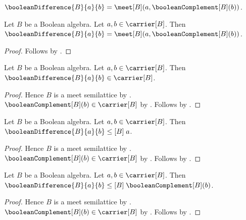 \begin{definition}\label{boolean_difference}
    $\booleanDifference{B}{a}{b}
        =\meet[B](a,\booleanComplement[B](b))$.
\end{definition}

\begin{proposition}\label{boolean_difference_apply}
    Let $B$ be a Boolean algebra.
    Let $a,b\in\carrier[B]$.
    Then $\booleanDifference{B}{a}{b}
        =\meet[B](a,\booleanComplement[B](b))$.
\end{proposition}
\begin{proof}
    Follows by .
\end{proof}

\begin{proposition}\label{boolean_difference_type}
    Let $B$ be a Boolean algebra.
    Let $a,b\in\carrier[B]$.
    Then $\booleanDifference{B}{a}{b}\in\carrier[B]$.
\end{proposition}
\begin{proof}
    Hence $B$ is a meet semilattice by
        .
    $\booleanComplement[B](b)\in\carrier[B]$ by
        .
    Follows by .
\end{proof}

\begin{proposition}\label{boolean_difference_leq_left}
    Let $B$ be a Boolean algebra.
    Let $a,b\in\carrier[B]$.
    Then $\booleanDifference{B}{a}{b}\mathrel{\leq[B]}a$.
\end{proposition}
\begin{proof}
    Hence $B$ is a meet semilattice by
        .
    $\booleanComplement[B](b)\in\carrier[B]$ by
        .
    Follows by .
\end{proof}

\begin{proposition}\label{boolean_difference_leq_complement_right}
    Let $B$ be a Boolean algebra.
    Let $a,b\in\carrier[B]$.
    Then $\booleanDifference{B}{a}{b}
        \mathrel{\leq[B]}\booleanComplement[B](b)$.
\end{proposition}
\begin{proof}
    Hence $B$ is a meet semilattice by
        .
    $\booleanComplement[B](b)\in\carrier[B]$ by
        .
    Follows by .
\end{proof}

